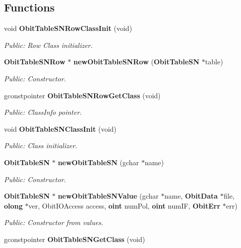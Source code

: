 \subsection*{Functions}
\begin{CompactItemize}
\item 
void {\bf Obit\-Table\-SNRow\-Class\-Init} (void)
\begin{CompactList}\small\item\em Public: Row Class initializer. \item\end{CompactList}\item 
{\bf Obit\-Table\-SNRow} $\ast$ {\bf new\-Obit\-Table\-SNRow} ({\bf Obit\-Table\-SN} $\ast$table)
\begin{CompactList}\small\item\em Public: Constructor. \item\end{CompactList}\item 
gconstpointer {\bf Obit\-Table\-SNRow\-Get\-Class} (void)
\begin{CompactList}\small\item\em Public: Class\-Info pointer. \item\end{CompactList}\item 
void {\bf Obit\-Table\-SNClass\-Init} (void)
\begin{CompactList}\small\item\em Public: Class initializer. \item\end{CompactList}\item 
{\bf Obit\-Table\-SN} $\ast$ {\bf new\-Obit\-Table\-SN} (gchar $\ast$name)
\begin{CompactList}\small\item\em Public: Constructor. \item\end{CompactList}\item 
{\bf Obit\-Table\-SN} $\ast$ {\bf new\-Obit\-Table\-SNValue} (gchar $\ast$name, {\bf Obit\-Data} $\ast$file, {\bf olong} $\ast$ver, Obit\-IOAccess access, {\bf oint} num\-Pol, {\bf oint} num\-IF, {\bf Obit\-Err} $\ast$err)
\begin{CompactList}\small\item\em Public: Constructor from values. \item\end{CompactList}\item 
gconstpointer {\bf Obit\-Table\-SNGet\-Class} (void)

\end{CompactItemize}
